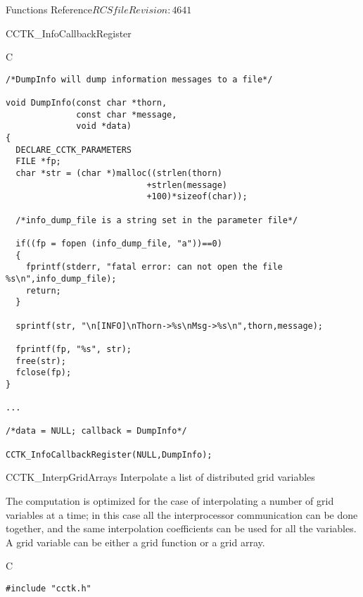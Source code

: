 \begin{cactuspart}{ Functions Reference}{$RCSfile$}{$Revision: 4641 $}
\begin{FunctionDescription}{CCTK\_InfoCallbackRegister}
\begin{SeeAlsoSection}
\end{SeeAlsoSection}

\begin{ExampleSection}
\begin{Example}{C}
\begin{verbatim}
/*DumpInfo will dump information messages to a file*/

void DumpInfo(const char *thorn,
              const char *message,
              void *data)
{
  DECLARE_CCTK_PARAMETERS
  FILE *fp;
  char *str = (char *)malloc((strlen(thorn)
                            +strlen(message)
                            +100)*sizeof(char));

  /*info_dump_file is a string set in the parameter file*/

  if((fp = fopen (info_dump_file, "a"))==0)
  {
    fprintf(stderr, "fatal error: can not open the file %s\n",info_dump_file);
    return;
  }

  sprintf(str, "\n[INFO]\nThorn->%s\nMsg->%s\n",thorn,message);

  fprintf(fp, "%s", str);
  free(str);
  fclose(fp);
}

...

/*data = NULL; callback = DumpInfo*/

CCTK_InfoCallbackRegister(NULL,DumpInfo);
\end{verbatim}
\end{Example}
\end{ExampleSection}
\end{FunctionDescription}


\begin{FunctionDescription}{CCTK\_InterpGridArrays}
\label{CCTK-InterpGridArrays}
Interpolate a list of distributed grid variables

The computation is optimized for the case of interpolating a
number of grid variables at a time; in this case all the interprocessor
communication can be done together, and the same interpolation
coefficients can be used for all the variables.  A grid variable can
be either a grid function or a grid array.

\begin{SynopsisSection}
\begin{Synopsis}{C}
\begin{verbatim}
#include "cctk.h"


\end{verbatim}
\end{Synopsis}
\end{SynopsisSection}
\end{FunctionDescription}
\end{cactuspart}
